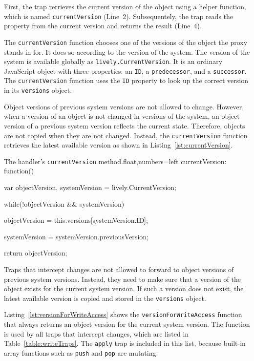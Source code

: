 First, the trap retrieves the current version of the object using a helper function, which is named \lstinline{currentVersion} (Line~2).
Subsequentely, the trap reads the property from the current version and returns the result (Line~4).

The \lstinline{currentVersion} function chooses one of the versions of the object the proxy stands in for.
It does so according to the version of the system.
The version of the system is available globally as \lstinline{lively.CurrentVersion}.
It is an ordinary JavaScript object with three properties: an \lstinline{ID}, a \lstinline{predecessor}, and a \lstinline{successor}.
The \lstinline{currentVersion} function uses the \lstinline{ID} property to look up the correct version in its \lstinline{versions} object.

Object versions of previous system versions are not allowed to change.
However, when a version of an object is not changed in versions of the system, an object version of a previous system version reflects the current state.
Therefore, objects are not copied when they are not changed.
Instead, the \lstinline{currentVersion} function retrieves the latest available version as shown in Listing~\ref{lst:currentVersion}.

\begin{code}{The handler's \lstinline{currentVersion} method.}{float,numbers=left}
currentVersion: function() {
    var objectVersion,
        systemVersion = lively.CurrentVersion;
    
    while(!objectVersion && systemVersion) {
        objectVersion = this.versions[systemVersion.ID];

        systemVersion = systemVersion.previousVersion;
    }
    
    return objectVersion;
}
\end{code}
\iffalse
\end{verbatim}\fi

Traps that intercept changes are not allowed to forward to object versions of previous system versions.
Instead, they need to make sure that a version of the object exists for the current system version.
If such a version does not exist, the latest available version is copied and stored in the \lstinline{versions} object.

Listing~\ref{lst:versionForWriteAccess} shows the \lstinline{versionForWriteAccess} function that always returns an object version for the current system version.
The function is used by all traps that intercept changes, which are listed in Table~\ref{table:writeTraps}.
The \lstinline{apply} trap is included in this list, because built-in array functions such as \lstinline{push} and \lstinline{pop} are mutating.


